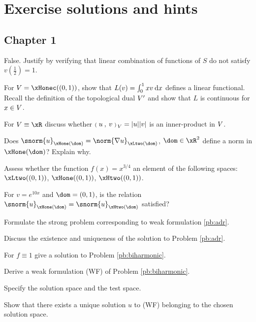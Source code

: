 
\chapter{Exercise solutions and hints}

\section{Chapter 1}

\begin{tmasltn}{1.1}

\begin{tmatsks}
\item False. Justify by verifying that linear combination of functions of $S$ do not satisfy $v(\frac{1}{2}) = 1$.
\item For $\xV = \xHonec((0,1))$, show that $L(v) =\int_0^1 xv \hspace{.5ex}{\mathrm d} x$ defines a linear functional. Recall the definition of the topological dual ${V}'$ and show that $L$ is continuous for $x \in {V}$.
\item For $\xV \equiv \xR$ discuss whether ${{\scriptstyle\mathbf{(}}\;u\:,\: v \;{\scriptstyle\mathbf{)}}}_{\,{V}} = |u| |v|$ is an inner-product in ${V}$.
\item Does $\snorm{u}_{\xHone(\dom)} = \norm{\nabla u}_{\xLtwo(\dom)}$, $\dom\in\xR^2$ define a norm in $\xHone(\dom)$? Explain why.
\item Assess whether the function $f(x) = x^{3/4}$ an element of the following spaces: $\xLtwo((0,1))$, $\xHone((0,1))$, $\xHtwo((0,1))$.
\item For $v = e^{10x}$ and $\dom = (0,1)$, is the relation $\snorm{u}_{\xHone(\dom)} = \snorm{u}_{\xHtwo(\dom)}$ satisfied?
\end{tmatsks}
\end{tmasltn}

\begin{tmasltn}{1.2}
\begin{tmatsks}
\item Formulate the strong problem corresponding to weak formulation \eqref{pb:adr}.
\item Discuss the existence and uniqueness of the solution to Problem \eqref{pb:adr}.
\end{tmatsks}
\end{tmasltn}

\begin{tmasltn}{1.3}
\begin{tmatsks}
\item For $f \equiv 1$ give a solution to Problem \eqref{pb:biharmonic}.
\item Derive a weak formulation (WF) of Problem \eqref{pb:biharmonic}.
\item Specify the solution space and the test space.
\item Show that there exists a unique solution $u$ to (WF) belonging to the chosen solution space.
\end{tmatsks}
\end{tmasltn}


